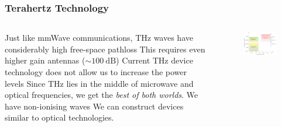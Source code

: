 \documentclass[10pt]{beamer}
\begin{document}
\begin{frame}
    \frametitle{Terahertz Technology}
    \normalsize
    \begin{columns}
        \normalsize
        \begin{column}{.6\textwidth}
            \begin{outline}
                \1 Just like mmWave communications, THz waves have considerably high free-space pathloss
                \2 This requires even higher gain antennas ($\sim \SI{100}{\dB}$)
                \1 Current THz device technology does not allow us to increase the power levels
                \1 Since THz lies in the middle of microwave and optical frequencies, we get the \textit{best of both worlds}.
                \2 We have non-ionising waves
                \2 We can construct devices similar to optical technologies.
            \end{outline}
        \end{column}
        \begin{column}{.44\textwidth}
            \scriptsize
            \begin{figure}
                \centering
                \includegraphics[width=.95\textwidth]{Scale.pdf}
                \label{fig:Terahertz_technology}
            \end{figure}
            \begin{figure}
                \centering

\end{figure}
\end{column}
\end{columns}
\end{frame}
\end{document}

